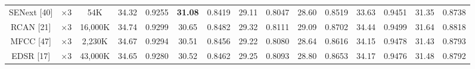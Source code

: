 \documentclass[twocolumn]{svjour3}          %
\begin{document}
\begin{table}
\begin{tabular}{|c|c|c|cc|cc|cc|cc|cc|cc|}
SENext [40] & $\times3$ &54K& \multicolumn{1}{c|}{34.32} &{0.9255}& \multicolumn{1}{c|}{\color{red}\textbf{31.08}} & {0.8419} & \multicolumn{1}{c|}{29.11} &{0.8047}& \multicolumn{1}{c|}{28.60} &{0.8519}& \multicolumn{1}{c|}{33.63} &{0.9451} &\multicolumn{1}{c|}{31.35} &{0.8738} \\


RCAN [21]& $\times3$ &16,000K& \multicolumn{1}{c|}{34.74} & 0.9299 & \multicolumn{1}{c|}{30.65} & 0.8482 &\multicolumn{1}{c|}{29.32} & 0.8111& \multicolumn{1}{c|}{29.09} & 0.8702 & \multicolumn{1}{c|}{34.44} & 0.9499
&\multicolumn{1}{c|}{31.64} & 0.8818\\


MFCC [47]& $\times 3$&2,230K& \multicolumn{1}{c|}{34.67} & 0.9294 & \multicolumn{1}{c|}{30.51} &0.8456 &\multicolumn{1}{c|}{29.22} & 0.8080& \multicolumn{1}{c|}{28.64} & 0.8616 & \multicolumn{1}{c|}{34.15} & 0.9478
&\multicolumn{1}{c|}{31.43} & 0.8793\\



EDSR [17]& $\times3$&43,000K& \multicolumn{1}{c|}{34.65} & 0.9280 & \multicolumn{1}{c|}{30.52} & 0.8462 &\multicolumn{1}{c|}{29.25} & 0.8093& \multicolumn{1}{c|}{28.80} & 0.8653 & \multicolumn{1}{c|}{34.17} & 0.9476
&\multicolumn{1}{c|}{31.48} &0.8792\\


\end{tabular}
\end{table}
\end{document}
